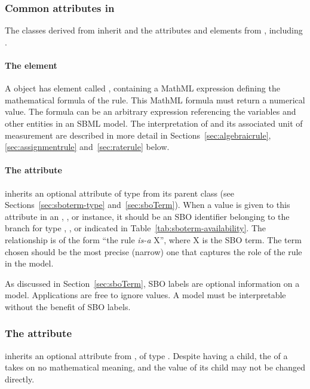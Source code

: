 \subsubsection{Common attributes in }
\label{sec:rule-math}\label{sec:rule-fields}\label{sec:rule-sboterm}

The classes derived from \Rule inherit  and
  the attributes and elements from \SBase, including
 .


\paragraph{The  element}

A \Rule object has  element called ,
containing a MathML expression defining the mathematical formula
of the rule.  This MathML formula must return a numerical value.
The formula can be an arbitrary expression referencing the
variables and other entities in an SBML model.  The interpretation
of  and its associated unit of measurement are
described in more detail in Sections~\ref{sec:algebraicrule},
\ref{sec:assignmentrule} and~\ref{sec:raterule} below.


\paragraph{The  attribute}

\Rule inherits an optional 
attribute of type  from its parent
class \SBase (see Sections~\ref{sec:sboterm-type}
and~\ref{sec:sboTerm}).  When a value is given to this
attribute in an \AlgebraicRule, \AssignmentRule, or
\RateRule instance, it should be an
SBO identifier belonging to the branch for type  \AlgebraicRule, \AssignmentRule, or
\RateRule indicated in Table~\ref{tab:sboterm-availability}.  The relationship is
of the form ``the rule \emph{is-a} X'', where X is
the SBO term.  The term chosen should be the most precise (narrow)
one that captures the role of the rule in the model.

As discussed in Section~\ref{sec:sboTerm}, SBO labels are optional
information on a model.  Applications are free to ignore
 values.  A model must be interpretable without the
benefit of SBO labels.

\begin{blockChanged}
\subsubsection{The  attribute}
\label{sec:rule-id}

\Rule inherits an optional  attribute from \SBase, of type .  Despite having a  child, the  of a \Rule takes on no mathematical meaning, and the value of its  child may not be changed directly.
\end{blockChanged}


